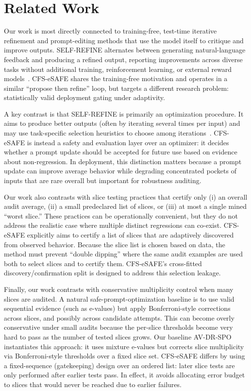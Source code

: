 \documentclass{article} %
\begin{document}
\section{Related Work}\label{sec:related}
Our work is most directly connected to training-free, test-time iterative refinement and prompt-editing methods that use the model itself to critique and improve outputs. SELF-REFINE alternates between generating natural-language feedback and producing a refined output, reporting improvements across diverse tasks without additional training, reinforcement learning, or external reward models~\cite{madaan-2023-self}. CFS-eSAFE shares the training-free motivation and operates in a similar “propose then refine” loop, but targets a different research problem: statistically valid deployment gating under adaptivity.

A key contrast is that SELF-REFINE is primarily an optimization procedure. It aims to produce better outputs (often by iterating several times per input) and may use task-specific selection heuristics to choose among iterations~\cite{madaan-2023-self}. CFS-eSAFE is instead a safety and evaluation layer over an optimizer: it decides whether a prompt update should be accepted for future use based on evidence about non-regression. In deployment, this distinction matters because a prompt update can improve average behavior while degrading concentrated pockets of inputs that are rare overall but important for robustness auditing.

Our work also contrasts with slice testing practices that certify only (i) an overall audit average, (ii) a small predeclared list of slices, or (iii) at most a single mined “worst slice.” These practices can be operationally convenient, but they do not address the realistic case where multiple distinct regressions can co-exist. CFS-eSAFE explicitly aims to certify a list of slices that are adaptively discovered from observed behavior. Because the slice list is chosen based on data, the method must prevent “double dipping” where the same audit examples are used both to select slices and to certify them. CFS-eSAFE’s cross-fitted discovery/confirmation split is designed to address this selection leakage.

Finally, our work contrasts with conservative multiplicity control when many slices are audited. A natural safe-prompt-optimization baseline is to use valid sequential evidence (such as e-values) but apply Bonferroni-style corrections across slices, and possibly across candidate attempts. This can become overly conservative under small audits because the per-slice thresholds become very hard to pass as the number of tested slices grows. Our baseline AV-DR-SPO instantiates this approach: it uses mixture e-values but corrects slice multiplicity via Bonferroni-style thresholds over a fixed slice set. CFS-eSAFE differs by using a fixed-sequence (gatekeeping) design over an ordered list: later slice tests are only performed after earlier tests pass. In effect, it avoids allocating error budget to slices that would never be reached due to earlier failures.
\end{document}

